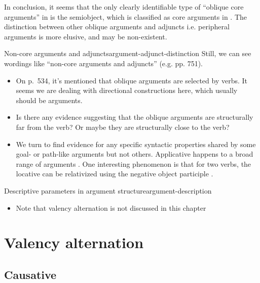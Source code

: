 \documentclass[a4paper, oneside, 12pt]{report}
\newcommand*{\citesec}[1]{\S~{#1}}
\newcommand*{\citepage}[1]{p.~{#1}}
\begin{document}
In conclusion, it seems that the only clearly identifiable type of ``oblique core arguments'' 
in 
is the semiobject,
which is classified as core arguments in \citet{jacques2021grammar}.
The distinction between other oblique arguments and adjuncts i.e. peripheral arguments
is more elusive, and may be non-existent.

\begin{todobox}{Non-core arguments and adjuncts}{argument-adjunct-distinction}
Still, we can see wordings like ``non-core arguments and adjuncts''
(e.g. pp. 751).
\begin{itemize}
    \item On \citepage{534}, it's mentioned that oblique arguments are selected by verbs.
    It seems we are dealing with directional constructions here,
    which usually should be arguments.
    \item Is there any evidence suggesting that the oblique arguments are structurally far from the verb?
    Or maybe they are structurally close to the verb?
    \item We turn to find evidence for any specific syntactic properties
    shared by some goal- or path-like arguments but not others.
    Applicative happens to a broad range of arguments 
    \citep[\citepage{859}]{jacques2021grammar}.
    One interesting phenomenon is that for two verbs,
    the locative can be relativized using the negative object participle 
    \citep[\citesec{23.5.5.2}]{jacques2021grammar}.
\end{itemize}
\end{todobox}

\begin{todobox}{Descriptive parameters in argument structure}{argument-description}
    \begin{itemize}
        \item Note that valency alternation is not discussed in this chapter
    \end{itemize}
\end{todobox}

\chapter{Valency alternation}

\section{Causative}
\end{document}
